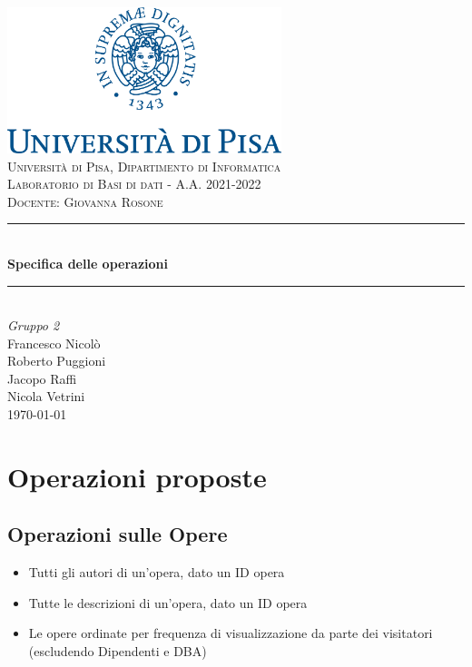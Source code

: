 \documentclass[a4paper,11pt]{article}
\newcommand{\HRule}{\rule{\linewidth}{0.5mm}} 	%
\begin{document}
\begin{titlepage}
\center
\includegraphics[width=0.6\textwidth]{img/unipi-logo.png}\\[1cm]

\textsc{\LARGE Università di Pisa, Dipartimento di Informatica}\\[1cm]

\textsc{\Large Laboratorio di Basi di dati - A.A. 2021-2022}\\[0.2cm]
\textsc{\large Docente: Giovanna Rosone}\\[1cm]

\HRule \\[0.8cm]
{ \huge \bfseries Specifica delle operazioni}\\[0.7cm]
\HRule \\[2cm]

\Huge \emph{Gruppo 2}\\[0.5cm]
\large Francesco Nicolò\\Roberto Puggioni\\Jacopo Raffi\\Nicola Vetrini\\[1.5cm]
{\large \today}\\[5cm]

\vfill
\end{titlepage}

\newpage
\tableofcontents
\newpage

\section{Operazioni proposte}
\subsection{Operazioni sulle Opere}
\begin{itemize}
	\item Tutti gli autori di un'opera, dato un ID opera
	\item Tutte le descrizioni di un'opera, dato un ID opera
	\item Le opere ordinate per frequenza di visualizzazione da parte dei visitatori (escludendo Dipendenti e DBA)
\end{itemize}
\end{document}
